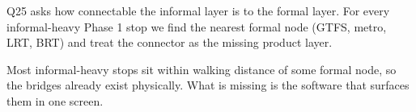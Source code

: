 Q25 asks how connectable the informal layer is to the formal layer.
For every informal-heavy Phase 1 stop we find the nearest formal node
(GTFS, metro, LRT, BRT) and treat the connector as the missing
product layer.


Most informal-heavy stops sit within walking distance of some formal
node, so the bridges already exist physically. What is missing is the
software that surfaces them in one screen.

